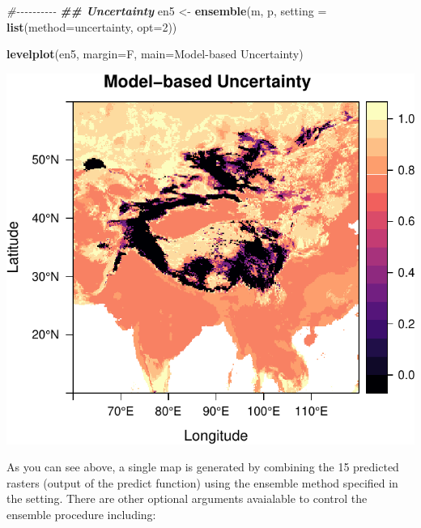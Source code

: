 \documentclass[
]{article}
\newenvironment{Shaded}{\begin{snugshade}}{\end{snugshade}}
\newcommand{\AttributeTok}[1]{\textcolor[rgb]{0.13,0.29,0.53}{#1}}
\newcommand{\CommentTok}[1]{\textcolor[rgb]{0.56,0.35,0.01}{\textit{#1}}}
\newcommand{\DecValTok}[1]{\textcolor[rgb]{0.00,0.00,0.81}{#1}}
\newcommand{\DocumentationTok}[1]{\textcolor[rgb]{0.56,0.35,0.01}{\textbf{\textit{#1}}}}
\newcommand{\FunctionTok}[1]{\textcolor[rgb]{0.13,0.29,0.53}{\textbf{#1}}}
\newcommand{\NormalTok}[1]{#1}
\newcommand{\OtherTok}[1]{\textcolor[rgb]{0.56,0.35,0.01}{#1}}
\newcommand{\StringTok}[1]{\textcolor[rgb]{0.31,0.60,0.02}{#1}}
\begin{document}
\begin{Shaded}
\begin{Highlighting}[]
\CommentTok{\#{-}{-}{-}{-}{-}{-}{-}{-}{-}{-}}
\DocumentationTok{\#\# Uncertainty}
\NormalTok{en5 }\OtherTok{\textless{}{-}} \FunctionTok{ensemble}\NormalTok{(m, p, }\AttributeTok{setting =} \FunctionTok{list}\NormalTok{(}\AttributeTok{method=}\StringTok{\textquotesingle{}uncertainty\textquotesingle{}}\NormalTok{, }\AttributeTok{opt=}\DecValTok{2}\NormalTok{))}

\FunctionTok{levelplot}\NormalTok{(en5, }\AttributeTok{margin=}\NormalTok{F, }\AttributeTok{main=}\StringTok{\textquotesingle{}Model{-}based Uncertainty\textquotesingle{}}\NormalTok{)}
\end{Highlighting}
\end{Shaded}

\includegraphics{sdm_R_files/figure-latex/unnamed-chunk-10-4.pdf}

As you can see above, a single map is generated by combining the 15
predicted rasters (output of the predict function) using the ensemble
method specified in the setting. There are other optional arguments
avaialable to control the ensemble procedure including:
\end{document}
